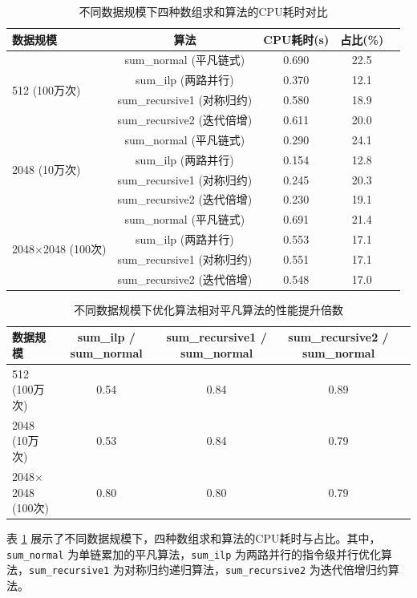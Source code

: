 \documentclass[a4paper]{article}
\begin{document}
\begin{table}[htbp]
  \centering
  \caption{不同数据规模下四种数组求和算法的CPU耗时对比}
  \label{tab:sum_perf}
  \begin{tabular}{lcccc}
    \toprule
    \textbf{数据规模} & \textbf{算法} & \textbf{CPU耗时(s)} & \textbf{占比(\%)} \\
    \midrule
    \multirow{4}{*}{512 (100万次)}
    & sum\_normal (平凡链式) & 0.690 & 22.5 \\
    & sum\_ilp (两路并行) & 0.370 & 12.1 \\
    & sum\_recursive1 (对称归约) & 0.580 & 18.9 \\
    & sum\_recursive2 (迭代倍增) & 0.611 & 20.0 \\
    \midrule
    \multirow{4}{*}{2048 (10万次)}
    & sum\_normal (平凡链式) & 0.290 & 24.1 \\
    & sum\_ilp (两路并行) & 0.154 & 12.8 \\
    & sum\_recursive1 (对称归约) & 0.245 & 20.3 \\
    & sum\_recursive2 (迭代倍增) & 0.230 & 19.1 \\
    \midrule
    \multirow{4}{*}{2048$\times$2048 (100次)}
    & sum\_normal (平凡链式) & 0.691 & 21.4 \\
    & sum\_ilp (两路并行) & 0.553 & 17.1 \\
    & sum\_recursive1 (对称归约) & 0.551 & 17.1 \\
    & sum\_recursive2 (迭代倍增) & 0.548 & 17.0 \\
    \bottomrule
  \end{tabular}
\end{table}

\begin{table}[htbp]
  \centering
  \caption{不同数据规模下优化算法相对平凡算法的性能提升倍数}
  \label{tab:sum_speedup}
  \begin{tabular}{lcccc}
    \toprule
    \textbf{数据规模} & \textbf{sum\_ilp / sum\_normal} & \textbf{sum\_recursive1 / sum\_normal} & \textbf{sum\_recursive2 / sum\_normal} \\
    \midrule
    512 (100万次) & 0.54 & 0.84 & 0.89 \\
    2048 (10万次) & 0.53 & 0.84 & 0.79 \\
    2048$\times$2048 (100次) & 0.80 & 0.80 & 0.79 \\
    \bottomrule
  \end{tabular}
\end{table}

表 \ref{tab:sum_perf} 展示了不同数据规模下，四种数组求和算法的CPU耗时与占比。其中，\texttt{sum\_normal} 为单链累加的平凡算法，\texttt{sum\_ilp} 为两路并行的指令级并行优化算法，\texttt{sum\_recursive1} 为对称归约递归算法，\texttt{sum\_recursive2} 为迭代倍增归约算法。
\end{document}
